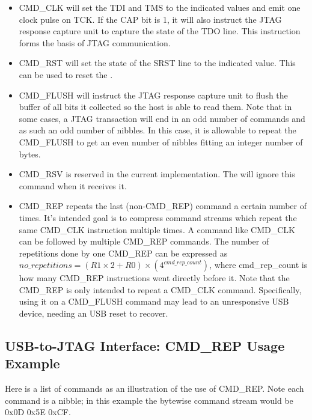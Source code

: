 \documentclass[main\_\_EN.tex]{subfiles}
\begin{document}
\begin{itemize}
\item CMD\_CLK will set the TDI and TMS to the indicated values and emit one clock pulse on TCK. If the CAP bit is 1, it will also instruct the JTAG response capture unit to capture the state of the TDO line. This instruction forms the basis of JTAG communication.

\item CMD\_RST will set the state of the SRST line to the indicated value. This can be used to reset the \chipname{}.

\item CMD\_FLUSH will instruct the JTAG response capture unit to flush the buffer of all bits it collected so the host is able to read them. Note that in some cases, a JTAG transaction will end in an odd number of commands and as such an odd number of nibbles. In this case, it is allowable to repeat the CMD\_FLUSH to get an even number of nibbles fitting an integer number of bytes.

\item CMD\_RSV is reserved in the current implementation. The \chipname{} will ignore this command when it receives it.

\item CMD\_REP repeats the last (non-CMD\_REP) command a certain number of times. It's intended goal is to compress command streams which repeat the same CMD\_CLK instruction multiple times. A command like CMD\_CLK can be followed by multiple CMD\_REP commands. The number of repetitions done by one CMD\_REP can be expressed as \begin{math}no\_repetitions = (R1 \times 2 + R0) \times (4^{cmd\_rep\_count})\end{math}, where cmd\_rep\_count is how many CMD\_REP instructions went directly before it. Note that the CMD\_REP is only intended to repeat a CMD\_CLK command. Specifically, using it on a CMD\_FLUSH command may lead to an unresponsive USB device, needing an USB reset to recover.
\end{itemize}

\subsection{USB-to-JTAG Interface: CMD\_REP Usage Example}


Here is a list of commands as an illustration of the use of CMD\_REP.
Note each command is a nibble; in this example the bytewise command stream would be 0x{}0D 0x{}5E 0x{}CF.
\end{document}
